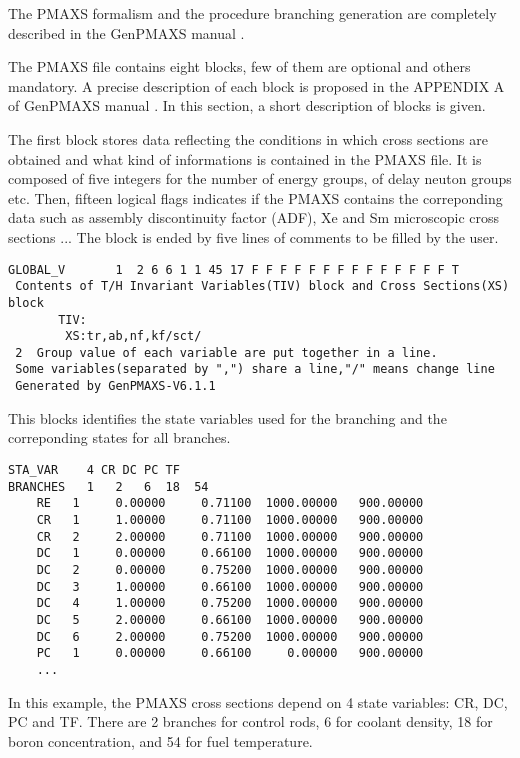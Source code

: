 The PMAXS formalism and the procedure branching generation are completely described in the GenPMAXS manual \cite{GENPMAXS}.

\vskip 0.08cm

The PMAXS file contains eight blocks, few of them are optional and others mandatory. A precise description of each block is proposed in the APPENDIX A of GenPMAXS manual \cite{GENPMAXS}. In this section, a short description of blocks is given.

\vskip 0.2cm


The first block stores data reflecting the conditions in which cross sections are obtained and what kind of informations is contained in the PMAXS file. It is composed of five integers for the number of energy groups, of delay neuton groups etc. Then, fifteen logical flags indicates if the PMAXS contains the correponding data such as assembly discontinuity factor (ADF), Xe and Sm microscopic cross sections ... The block is ended by five lines of comments to be filled by the user.
\begin{verbatim}
GLOBAL_V       1  2 6 6 1 1 45 17 F F F F F F F F F F F F F F T 
 Contents of T/H Invariant Variables(TIV) block and Cross Sections(XS) block 
       TIV: 
        XS:tr,ab,nf,kf/sct/ 
 2  Group value of each variable are put together in a line. 
 Some variables(separated by ",") share a line,"/" means change line 
 Generated by GenPMAXS-V6.1.1 
\end{verbatim}

\vskip 0.2cm


This blocks identifies the state variables used for the branching and the correponding states for all branches.
\begin{verbatim}
STA_VAR    4 CR DC PC TF
BRANCHES   1   2   6  18  54
    RE   1     0.00000     0.71100  1000.00000   900.00000
    CR   1     1.00000     0.71100  1000.00000   900.00000
    CR   2     2.00000     0.71100  1000.00000   900.00000
    DC   1     0.00000     0.66100  1000.00000   900.00000
    DC   2     0.00000     0.75200  1000.00000   900.00000
    DC   3     1.00000     0.66100  1000.00000   900.00000
    DC   4     1.00000     0.75200  1000.00000   900.00000
    DC   5     2.00000     0.66100  1000.00000   900.00000
    DC   6     2.00000     0.75200  1000.00000   900.00000
    PC   1     0.00000     0.66100     0.00000   900.00000
    ...
\end{verbatim}
In this example, the PMAXS cross sections depend on 4 state variables: CR, DC, PC and TF. There are 2 branches for control rods, 6 for coolant density, 18 for boron concentration, and 54 for fuel temperature.


